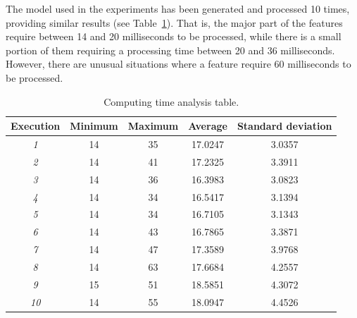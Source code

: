 The model used in the experiments has been generated and processed 10 times, providing similar results 
(see Table~\ref{execution_times}). That is, the
major part of the features require between 14 and 20 milliseconds to be processed, while there is a small
portion of them requiring a processing time between 20 and 36 milliseconds. However, there are unusual situations
where a feature require 60 milliseconds to be processed.

\begin{table}[h]
	\centering
	\begin{tabular}{|c|c|c|c|c|}
		\hline
		\textbf{Execution} & \textbf{Minimum} &  \textbf{Maximum} &  \textbf{Average} &  \textbf{Standard deviation} \\ \hline
		\textit{1}		& 14	& 35	& 17.0247	& 3.0357 	\\ \hline
		\textit{2}		& 14	& 41 	& 17.2325	& 3.3911	\\ \hline
		\textit{3}		& 14	& 36 	& 16.3983 	& 3.0823 	\\ \hline
		\textit{4}		& 14	& 34	& 16.5417	& 3.1394 	\\ \hline
		\textit{5}		& 14	& 34	& 16.7105	& 3.1343 	\\ \hline
		\textit{6}		& 14	& 43	& 16.7865	& 3.3871 	\\ \hline
		\textit{7}		& 14	& 47	& 17.3589	& 3.9768 	\\ \hline
		\textit{8}		& 14	& 63	& 17.6684	& 4.2557 	\\ \hline
		\textit{9}		& 15	& 51	& 18.5851	& 4.3072 	\\ \hline				
		\textit{10}		& 14	& 55	& 18.0947	& 4.4526 	\\ \hline			
	\end{tabular}
	\caption{Computing time analysis table.}
	\label{execution_times}
\end{table}

